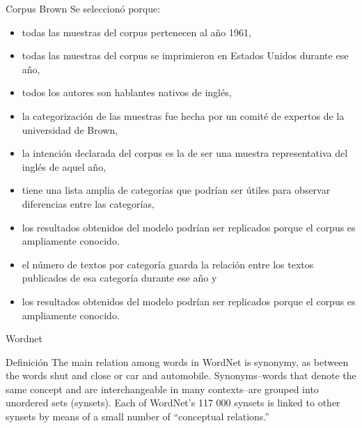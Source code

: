 \documentclass[presentation]{beamer}
\begin{document}
\begin{frame}[label={sec:org541827c}]{Corpus Brown}
Se seleccionó porque:
\small
\begin{itemize}
\item todas las muestras del corpus pertenecen al año 1961,
\item todas las muestras del corpus se imprimieron en Estados Unidos durante ese año,
\item todos los autores son hablantes nativos de inglés,
\item la categorización de las muestras fue hecha por un comité de expertos de la universidad de Brown,
\item la intención declarada del corpus es la de ser una muestra representativa del inglés de aquel año,
\item tiene una lista amplia de categorías que podrían ser útiles para observar diferencias entre las categorías,
\item los resultados obtenidos del modelo podrían ser replicados porque el corpus es ampliamente conocido.
\item el número de textos por categoría guarda la relación entre los textos publicados de esa categoría durante ese año y
\item los resultados obtenidos del modelo podrían ser replicados porque el corpus es ampliamente conocido.
\end{itemize}
\normalsize
\end{frame}

\begin{frame}[label={sec:org369dee0}]{Wordnet}
\begin{block}{Definición}
The main relation among words in WordNet is synonymy, as between the words shut and close or car and automobile.
Synonyms--words that denote the same concept and are interchangeable in many contexts--are grouped into unordered sets (synsets).
Each of WordNet’s 117 000 synsets is linked to other synsets by means of a small number of “conceptual relations.”
\cite{fellbaum_1998}
\end{block}
\end{frame}
\end{document}
